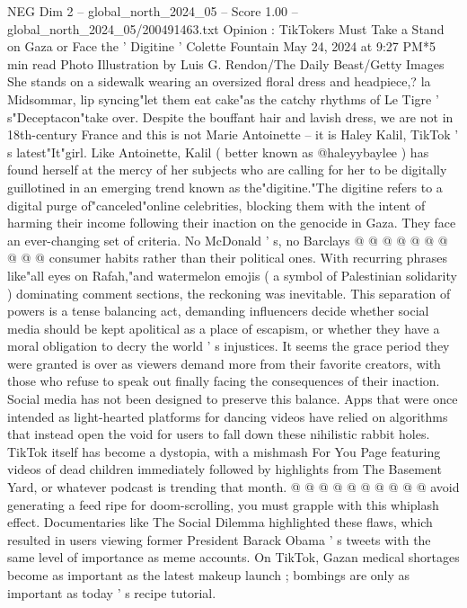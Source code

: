 \begin{textsample}{NEG Dim 2 – global\_north\_2024\_05 – Score 1.00 – global\_north\_2024\_05/200491463.txt}  \label{ex:f2_neg_061}
Opinion : TikTokers Must Take a Stand on Gaza or Face the ' Digitine ' Colette Fountain May 24, 2024 at 9:27 PM*5 min read Photo Illustration by Luis G.
Rendon/The Daily Beast/Getty Images She stands on a sidewalk wearing an oversized floral dress and headpiece,? la Midsommar, lip syncing"let them eat cake"as the catchy rhythms of Le Tigre ' s"Deceptacon"take over.
Despite the bouffant hair and lavish dress, we are not in 18th-century France and this is not Marie Antoinette -- it is Haley Kalil, TikTok ' s latest"It"girl.
Like Antoinette, Kalil ( better known as @haleyybaylee ) has found herself at the mercy of her subjects who are calling for her to be digitally guillotined in an emerging trend known as the"digitine."The digitine refers to a digital purge of"canceled"online celebrities, blocking them with the intent of harming their income following their inaction on the genocide in Gaza.
They face an ever-changing set of criteria.
No McDonald ' s, no Barclays @ @ @ @ @ @ @ @ @ @ consumer habits rather than their political ones.
With recurring phrases like"all eyes on Rafah,"and watermelon emojis ( a symbol of Palestinian solidarity ) dominating comment sections, the reckoning was inevitable.
This separation of powers is a tense balancing act, demanding influencers decide whether social media should be kept apolitical as a place of escapism, or whether they have a moral obligation to decry the world ' s injustices.
It seems the grace period they were granted is over as viewers demand more from their favorite creators, with those who refuse to speak out finally facing the consequences of their inaction.
Social media has not been designed to preserve this balance.
Apps that were once intended as light-hearted platforms for dancing videos have relied on algorithms that instead open the void for users to fall down these nihilistic rabbit holes.
TikTok itself has become a dystopia, with a mishmash For You Page featuring videos of dead children immediately followed by highlights from The Basement Yard, or whatever podcast is trending that month. @ @ @ @ @ @ @ @ @ @ avoid generating a feed ripe for doom-scrolling, you must grapple with this whiplash effect.
Documentaries like The Social Dilemma highlighted these flaws, which resulted in users viewing former President Barack Obama ' s tweets with the same level of importance as meme accounts.
On TikTok, Gazan medical shortages become as important as the latest makeup launch ; bombings are only as important as today ' s recipe tutorial.

\end{textsample}
